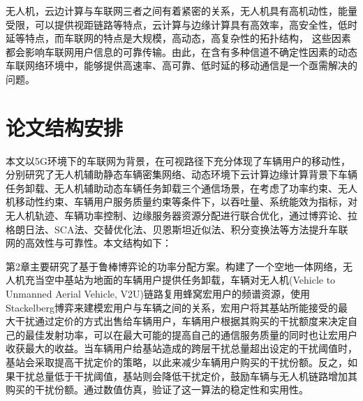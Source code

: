 \textcolor[RGB]{202,12,22}{}
无人机，云边计算与车联网三者之间有着紧密的关系，无人机具有高机动性，能量受限，可以提供视距链路等特点，云计算与边缘计算具有高效率，高安全性，低时延等特点，而车联网的特点是大规模，高动态，高复杂性的拓扑结构，
这些因素都会影响车联网用户信息的可靠传输。由此，在含有多种信道不确定性因素的动态车联网络环境中，能够提供高速率、高可靠、低时延的移动通信是一个亟需解决的问题。

\section{论文结构安排}\label{section1-4}
本文以5G环境下的车联网为背景，在可视路径下充分体现了车辆用户的移动性，分别研究了无人机辅助静态车辆密集网络、动态环境下云计算边缘计算背景下车辆任务卸载、无人机辅助动态车辆任务卸载三个通信场景，在考虑了功率约束、无人机移动性约束、车辆用户服务质量约束等条件下，以吞吐量、系统能效为指标，对无人机轨迹、车辆功率控制、边缘服务器资源分配进行联合优化，通过博弈论、拉格朗日法、SCA法、交替优化法、贝恩斯坦近似法、积分变换法等方法提升车联网的高效性与可靠性。本文结构如下：

第2章主要研究了基于鲁棒博弈论的功率分配方案。构建了一个空地一体网络，无人机充当空中基站为地面的车辆用户提供任务卸载，车辆对无人机(Vehicle to Unmanned Aerial Vehicle, V2U)链路复用蜂窝宏用户的频谱资源，使用Stackelberg博弈来建模宏用户与车辆之间的关系，宏用户将其基站所能接受的最大干扰通过定价的方式出售给车辆用户，车辆用户根据其购买的干扰额度来决定自己的最佳发射功率，可以在最大可能的提高自己的通信服务质量的同时也让宏用户收获最大的收益。当车辆用户给基站造成的跨层干扰总量超出设定的干扰阈值时，基站会采取提高干扰定价的策略，以此来减少车辆用户购买的干扰份额。反之，如果干扰总量低于干扰阈值，基站则会降低干扰定价，鼓励车辆与无人机链路增加其购买的干扰份额。通过数值仿真，验证了这一算法的稳定性和实用性。

